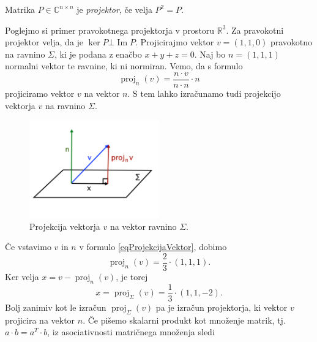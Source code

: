 \documentclass[mat1]{fmfdelo}
\newcommand{\R}{\mathbb R}
\newcommand{\C}{\mathbb C}
\DeclareMathOperator{\Ima}{Im}
\begin{document}
\begin{definicija}
    Matrika $P \in \C^{n \times n}$ je \emph{projektor}, če velja $P^2 = P$.
\end{definicija}
\begin{zgled}
    Poglejmo si primer pravokotnega projektorja v prostoru $\R^3$. Za pravokotni projektor velja, da je $\ker P \bot \Ima P$. Projicirajmo vektor $v = (1,1,0)$ pravokotno na ravnino $\Sigma$, ki je podana z enačbo $x + y + z = 0$. Naj bo $n = (1,1,1)$ normalni vektor te ravnine, ki ni normiran. Vemo, da s formulo
    \begin{equation}\label{eqProjekcijaVektor}
        \operatorname{proj}_{n}(v) = \frac{n \cdot v}{n\cdot n}\cdot n
    \end{equation}
    projiciramo vektor $v$ na vektor $n$. S tem lahko izračunamo tudi projekcijo vektorja $v$ na ravnino $\Sigma$.
    \begin{figure}[H]
        \vspace{-10pt}
        \centering
        \includegraphics[width=0.5\textwidth]{projekcija.jpg}
        \vspace{-25pt}
        \caption{Projekcija vektorja $v$ na vektor ravnino $\Sigma$.}
    \end{figure}
    Če vstavimo $v$ in $n$ v formulo \eqref{eqProjekcijaVektor}, dobimo
    \begin{equation*}
        \operatorname{proj}_{n}(v) = \frac{2}{3}\cdot (1,1,1).
    \end{equation*}
    Ker velja $x = v - \operatorname{proj}_{n}(v)$, je torej
    \begin{equation*}
        x = \operatorname{proj}_\Sigma (v) = \frac{1}{3}\cdot (1,1,-2).
    \end{equation*}
    Bolj zanimiv kot le izračun $\operatorname{proj}_\Sigma (v)$ pa je izračun projektorja, ki vektor $v$ projicira na vektor $n$. Če pišemo skalarni produkt kot množenje matrik, tj.\ $a\cdot b = a^T \cdot b$, iz asociativnosti matričnega množenja sledi
    \begin{equation*}

\end{equation*}
\end{zgled}
\end{document}
